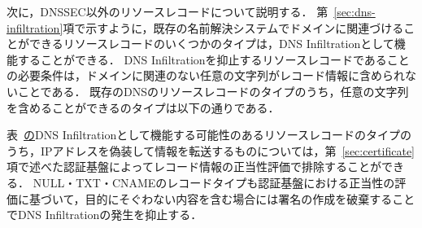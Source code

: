 次に，DNSSEC以外のリソースレコードについて説明する．
第~\ref{sec:dns-infiltration}項で示すように，既存の名前解決システムでドメインに関連づけることができるリソースレコードのいくつかのタイプは，DNS Infiltrationとして機能することができる．
DNS Infiltrationを抑止するリソースレコードであることの必要条件は，ドメインに関連のない任意の文字列がレコード情報に含められないことである．
既存のDNSのリソースレコードのタイプのうち，任意の文字列を含めることができるのタイプは以下の通りである．

表~\href{tab:infil-rtype}のDNS Infiltrationとして機能する可能性のあるリソースレコードのタイプのうち，IPアドレスを偽装して情報を転送するものについては，第~\ref{sec:certificate}項で述べた認証基盤によってレコード情報の正当性評価で排除することができる．
NULL・TXT・CNAMEのレコードタイプも認証基盤における正当性の評価に基づいて，目的にそぐわない内容を含む場合には署名の作成を破棄することでDNS Infiltrationの発生を抑止する．

